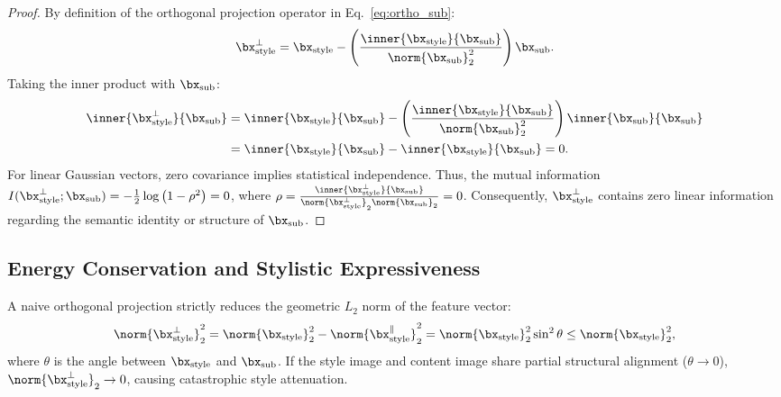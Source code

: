\begin{proof}
By definition of the orthogonal projection operator in Eq.~\eqref{eq:ortho_sub}:
\begin{equation}
    \bx_{\text{style}}^\perp = \bx_{\text{style}} - \left( \frac{\inner{\bx_{\text{style}}}{\bx_{\text{sub}}}}{\norm{\bx_{\text{sub}}}_2^2} \right) \bx_{\text{sub}}.
\end{equation}
Taking the inner product with $\bx_{\text{sub}}$:
\begin{align}
    \inner{\bx_{\text{style}}^\perp}{\bx_{\text{sub}}} &= \inner{\bx_{\text{style}}}{\bx_{\text{sub}}} - \left( \frac{\inner{\bx_{\text{style}}}{\bx_{\text{sub}}}}{\norm{\bx_{\text{sub}}}_2^2} \right) \inner{\bx_{\text{sub}}}{\bx_{\text{sub}}} \\
    &= \inner{\bx_{\text{style}}}{\bx_{\text{sub}}} - \inner{\bx_{\text{style}}}{\bx_{\text{sub}}} = 0.
\end{align}
For linear Gaussian vectors, zero covariance implies statistical independence. Thus, the mutual information $I(\bx_{\text{style}}^\perp; \bx_{\text{sub}}) = -\frac{1}{2} \log \left( 1 - \rho^2 \right) = 0$, where $\rho = \frac{\inner{\bx_{\text{style}}^\perp}{\bx_{\text{sub}}}}{\norm{\bx_{\text{style}}^\perp}_2 \norm{\bx_{\text{sub}}}_2} = 0$. Consequently, $\bx_{\text{style}}^\perp$ contains zero linear information regarding the semantic identity or structure of $\bx_{\text{sub}}$.
\end{proof}

\subsection{Energy Conservation and Stylistic Expressiveness}
\label{subsec:proof_energy}

A naive orthogonal projection strictly reduces the geometric $L_2$ norm of the feature vector:
\begin{equation}
    \norm{\bx_{\text{style}}^\perp}_2^2 = \norm{\bx_{\text{style}}}_2^2 - \norm{\bx_{\text{style}}^\parallel}_2^2 = \norm{\bx_{\text{style}}}_2^2 \sin^2 \theta \le \norm{\bx_{\text{style}}}_2^2,
\end{equation}
where $\theta$ is the angle between $\bx_{\text{style}}$ and $\bx_{\text{sub}}$. If the style image and content image share partial structural alignment ($\theta \to 0$), $\norm{\bx_{\text{style}}^\perp}_2 \to 0$, causing catastrophic style attenuation.

